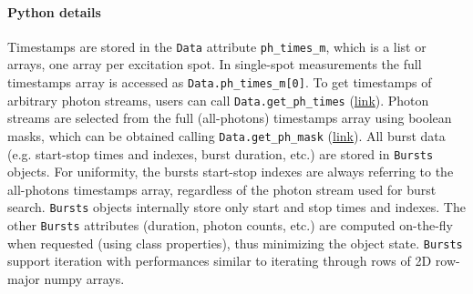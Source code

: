 \paragraph{Python details}
Timestamps are stored in the \verb|Data| attribute \verb|ph_times_m|, which is a list
or arrays, one array per excitation spot. In single-spot measurements the full
timestamps array is accessed as \verb|Data.ph_times_m[0]|. To get  timestamps
of arbitrary photon streams, users can call \verb|Data.get_ph_times|
(\href{http://fretbursts.readthedocs.org/en/latest/data_class.html?highlight=get_ph_times#fretbursts.burstlib.Data.get_ph_times}{link}).
Photon streams are selected from the full (all-photons) timestamps array using
boolean masks, which can be obtained calling \verb|Data.get_ph_mask|
(\href{http://fretbursts.readthedocs.org/en/latest/data_class.html?highlight=get_ph_mask#fretbursts.burstlib.Data.get_ph_mask}{link}).
All burst data (e.g. start-stop times and indexes, burst duration, etc.) are stored in 
\verb|Bursts| objects. For uniformity, the bursts start-stop
indexes are always referring to the all-photons timestamps array,
regardless of the photon stream used for burst search.
\verb|Bursts| objects 
internally store only start and stop times and indexes. 
The other \verb|Bursts| attributes (duration, photon counts, etc.) are computed on-the-fly 
when requested (using class properties), thus minimizing the object state. 
\verb|Bursts| support iteration
with performances similar to iterating through rows of 2D row-major numpy arrays.


